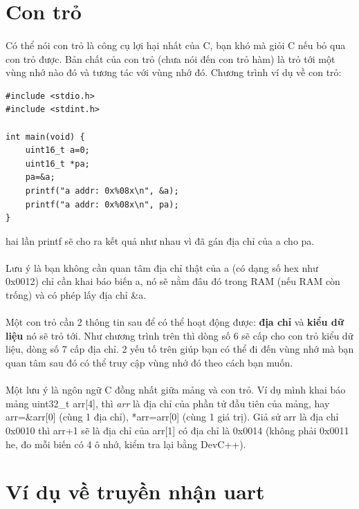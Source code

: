 \documentclass[12pt,a5paper]{book}
\begin{document}
\section{Con trỏ}
\paragraph{}
Có thể nói con trỏ là công cụ lợi hại nhất của C, bạn khó mà giỏi C nếu bỏ qua con trỏ được. Bản chất của con trỏ (chưa nói đến con trỏ hàm) là trỏ tới một vùng nhớ nào đó và tương tác với vùng nhớ đó. Chương trình ví dụ về con trỏ:
\begin{lstlisting}
#include <stdio.h>
#include <stdint.h>

int main(void) {
	uint16_t a=0;
	uint16_t *pa;
	pa=&a;
	printf("a addr: 0x%08x\n", &a);
	printf("a addr: 0x%08x\n", pa);
}
\end{lstlisting}

hai lần printf sẽ cho ra kết quả như nhau vì đã gán địa chỉ của a cho pa.
\paragraph{}
Lưu ý là bạn không cần quan tâm địa chỉ thật của a (có dạng số hex như 0x0012) chỉ cần khai báo biến a, nó sẽ nằm đâu đó trong RAM (nếu RAM còn trống) và có phép lấy địa chỉ \&a.
\paragraph{}
Một con trỏ cần 2 thông tin sau để có thể hoạt động được: \textbf{địa chỉ} và \textbf{kiểu dữ liệu} nó sẽ trỏ tới. Như chương trình trên thì dòng số 6 sẽ cấp cho con trỏ kiểu dữ liệu, dòng số 7 cấp địa chỉ. 2 yếu tố trên giúp bạn có thể đi đến vùng nhớ mà bạn quan tâm sau đó có thể truy cập vùng nhớ đó theo cách bạn muốn.
\paragraph{}
Một lưu ý là ngôn ngữ C đồng nhất giữa mảng và con trỏ. Ví dụ mình khai báo mảng uint32\_t arr[4], thì \textit{arr} là địa chỉ của phần tử đầu tiên của mảng, hay arr=\&arr[0] (cùng 1 địa chỉ), *arr=arr[0] (cùng 1 giá trị). Giả sử arr là địa chỉ 0x0010 thì arr+1 sẽ là địa chỉ của arr[1] có địa chỉ là 0x0014 (không phải 0x0011 he, đo mỗi biến có 4 ô nhớ, kiểm tra lại bằng DevC++).
\section{Ví dụ về truyền nhận uart}
\end{document}
